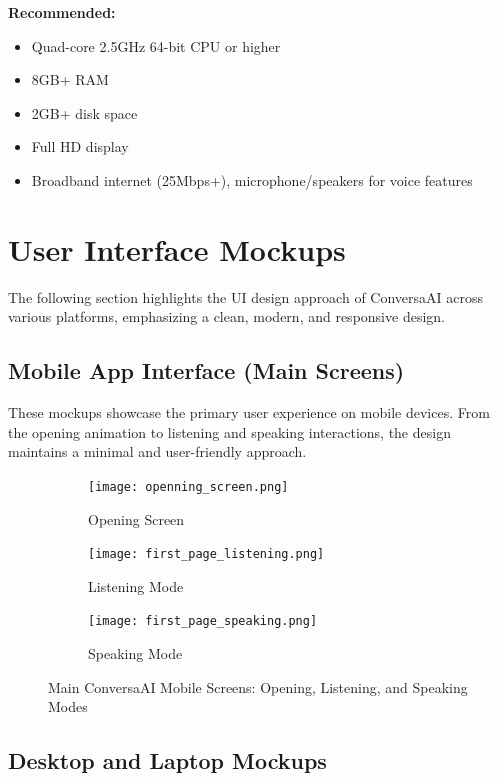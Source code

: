 \documentclass[12pt]{article}
\begin{document}
\noindent \textbf{Recommended:}
\begin{itemize}
    \item Quad-core 2.5GHz 64-bit CPU or higher
    \item 8GB+ RAM
    \item 2GB+ disk space
    \item Full HD display
    \item Broadband internet (25Mbps+), microphone/speakers for voice features
\end{itemize}

\section*{User Interface Mockups}

The following section highlights the UI design approach of ConversaAI across various platforms, emphasizing a clean, modern, and responsive design.

\subsection*{Mobile App Interface (Main Screens)}

These mockups showcase the primary user experience on mobile devices. From the opening animation to listening and speaking interactions, the design maintains a minimal and user-friendly approach.

\begin{figure}[h!]
    \centering
    \begin{subfigure}[b]{0.32\textwidth}
        \centering
        \texttt{[image: openning\_screen.png]}
        \caption{Opening Screen}
    \end{subfigure}
    \hfill
    \begin{subfigure}[b]{0.32\textwidth}
        \centering
        \texttt{[image: first\_page\_listening.png]}
        \caption{Listening Mode}
    \end{subfigure}
    \hfill
    \begin{subfigure}[b]{0.32\textwidth}
        \centering
        \texttt{[image: first\_page\_speaking.png]}
        \caption{Speaking Mode}
    \end{subfigure}
    \caption{Main ConversaAI Mobile Screens: Opening, Listening, and Speaking Modes}
    \label{fig:mobile_ui}
\end{figure}


\subsection*{Desktop and Laptop Mockups}
\end{document}
